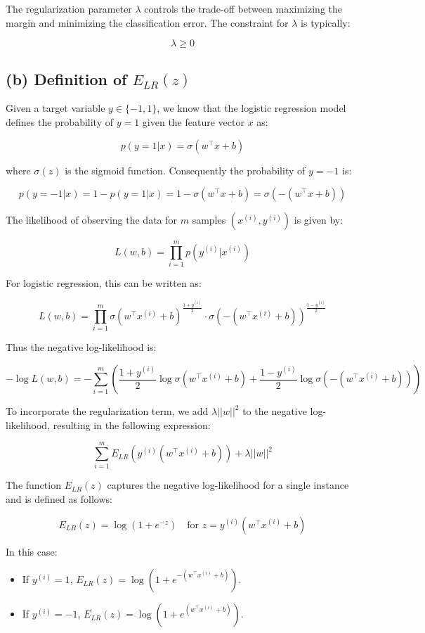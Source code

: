 \documentclass[12pt]{article}
\begin{document}
The regularization parameter $\lambda$ controls the trade-off between maximizing the margin and minimizing the classification error. The constraint for $\lambda$ is typically:

\[
    \lambda \geq 0
\]

\subsection*{(b) Definition of $E_{LR}(z)$}
Given a target variable \(y \in \{-1, 1\}\), we know that the logistic regression model defines the probability of \(y = 1\) given the feature vector \(x\) as:

\[
p(y = 1|x) = \sigma(w^\top x + b)
\]

where $\sigma(z)$ is the sigmoid function. Consequently the probability of \(y = -1\) is:

\[
p(y = -1|x) = 1 - p(y = 1|x) = 1 - \sigma(w^\top x + b) = \sigma(- (w^\top x + b))
\]

The likelihood of observing the data for \(m\) samples \((x^{(i)}, y^{(i)})\) is given by:

\[
L(w, b) = \prod_{i=1}^{m} p(y^{(i)}|x^{(i)})
\]

For logistic regression, this can be written as:

\[
L(w, b) = \prod_{i=1}^{m} \sigma(w^\top x^{(i)} + b)^{\frac{1 + y^{(i)}}{2}} \cdot \sigma(- (w^\top x^{(i)} + b))^{\frac{1 - y^{(i)}}{2}}
\]

Thus the negative log-likelihood is:

\[
-\log L(w, b) = -\sum_{i=1}^{m} \left( \frac{1 + y^{(i)}}{2} \log \sigma(w^\top x^{(i)} + b) + \frac{1 - y^{(i)}}{2} \log \sigma(- (w^\top x^{(i)} + b)) \right)
\]

To incorporate the regularization term, we add \(\lambda ||w||^2\) to the negative log-likelihood, resulting in the following expression:

\[
\sum_{i=1}^{m} E_{LR}(y^{(i)}(w^\top x^{(i)} + b)) + \lambda ||w||^2
\]

The function \(E_{LR}(z)\) captures the negative log-likelihood for a single instance and is defined as follows:

\[
E_{LR}(z) = \log(1 + e^{-z}) \quad \text{for } z = y^{(i)}(w^\top x^{(i)} + b)
\]

In this case:
\begin{itemize}
    \item If \(y^{(i)} = 1\), \(E_{LR}(z) = \log(1 + e^{-(w^\top x^{(i)} + b)})\).
    \item If \(y^{(i)} = -1\), \(E_{LR}(z) = \log(1 + e^{(w^\top x^{(i)} + b)})\).
\end{itemize}
\end{document}
